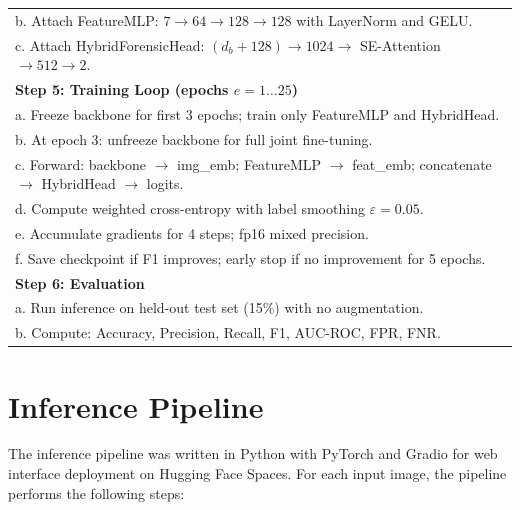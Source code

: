 \begin{longtable}{|p{}|}
\quad b. Attach FeatureMLP: $7 \rightarrow 64 \rightarrow 128 \rightarrow 128$ with LayerNorm and GELU. \\
\quad c. Attach HybridForensicHead: $(d_{b}+128) \rightarrow 1024 \rightarrow$ SE-Attention $\rightarrow 512 \rightarrow 2$. \\
\hline
\small\textbf{Step 5: Training Loop (epochs $e = 1 \ldots 25$)} \\
\quad a. Freeze backbone for first 3 epochs; train only FeatureMLP and HybridHead. \\
\quad b. At epoch 3: unfreeze backbone for full joint fine-tuning. \\
\quad c. Forward: backbone $\rightarrow$ img\_emb; FeatureMLP $\rightarrow$ feat\_emb; concatenate $\rightarrow$ HybridHead $\rightarrow$ logits. \\
\quad d. Compute weighted cross-entropy with label smoothing $\varepsilon = 0.05$. \\
\quad e. Accumulate gradients for 4 steps; fp16 mixed precision. \\
\quad f. Save checkpoint if F1 improves; early stop if no improvement for 5 epochs. \\
\hline
\small\textbf{Step 6: Evaluation} \\
\quad a. Run inference on held-out test set (15\%) with no augmentation. \\
\quad b. Compute: Accuracy, Precision, Recall, F1, AUC-ROC, FPR, FNR. \\
\end{longtable}
\renewcommand{\arraystretch}{1}

\section{Inference Pipeline}

The inference pipeline was written in Python with PyTorch and Gradio for web interface deployment on Hugging Face Spaces. For each input image, the pipeline performs the following steps:

